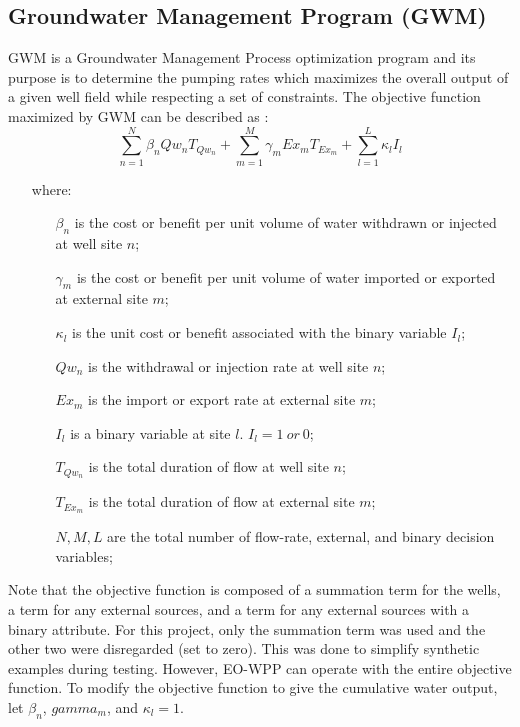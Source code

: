 \documentclass[authoryear]{elsarticle}
\begin{document}
\subsection{Groundwater Management Program (GWM)} \label{GWM}
GWM is a Groundwater Management Process optimization program and its purpose is to determine the pumping rates which maximizes the overall output of a given well field while respecting a set of constraints. The objective function maximized by GWM can be described as \citep{ahlfeld2005gwm}:
\begin{equation}\label{GWMObjFunc}
    \sum_{n=1}^{N} \beta_{n}Qw_{n}T_{Qw_{n}}
    +
    \sum_{m=1}^{M} \gamma_{m}Ex_{m}T_{Ex_{m}}
    +
    \sum_{l=1}^{L} \kappa_{l}I_{l}
\end{equation}

\begin{itemize}
    \item [where:]
    \item[]
        \begin{itemize}[noitemsep]
        \item[$\beta_{n}$] is the cost or benefit per unit volume of water withdrawn or injected at well site $n$;
        \item[$\gamma_{m}$] is the cost or benefit per unit volume of water imported or exported at external site $m$;
        \item[$\kappa_{l}$] is the unit cost or benefit associated with the binary variable $I_{l}$;
        \item[$Qw_{n}$] is the withdrawal or injection rate at well site $n$;
        \item[$Ex_{m}$] is the import or export rate at external site $m$;
        \item[$I_{l}$] is a binary variable at site $l$. $I_{l}=1\ or\ 0$;
        \item[$T_{Qw_{n}}$] is the total duration of flow at well site $n$;
        \item[$T_{Ex_{m}}$] is the total duration of flow at external site $m$;
        \item[$N,M,L$] are the total number of flow-rate, external, and binary decision variables;
        \end{itemize}
\end{itemize}

Note that the objective function is composed of a summation term for the wells, a term for any external sources, and a term for any external sources with a binary attribute. For this project, only the summation term was used and the other two were disregarded (set to zero). This was done to simplify synthetic examples during testing. However, EO-WPP can operate with the entire objective function. To modify the objective function to give the cumulative water output, let $\beta_n$, $gamma_m$, and $\kappa_l=1$.
\end{document}
